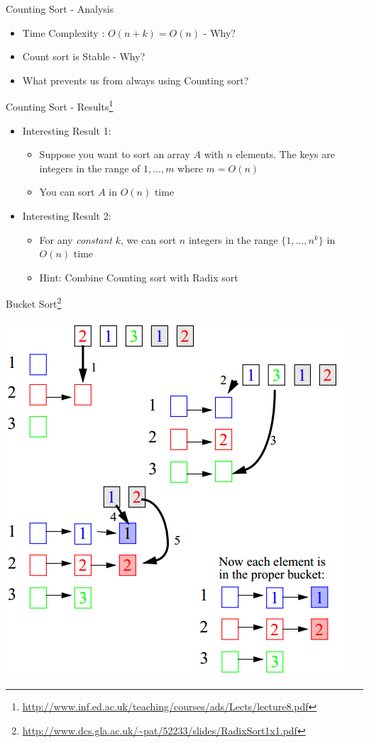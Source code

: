 \documentclass{beamer}
\begin{document}
\begin{frame}{Counting Sort - Analysis}
\begin{itemize}
\item Time Complexity : $O(n+k) = O(n)$ - Why?
\item Count sort is Stable - Why?
\item What prevents us from always using Counting sort?
\end{itemize}
\end{frame}


\begin{frame}{Counting Sort - Results\footnote{\url{http://www.inf.ed.ac.uk/teaching/courses/ads/Lects/lecture8.pdf}}}
\begin{itemize}
\item Interesting Result 1:
\begin{itemize}
    \item Suppose you want to sort an array $A$ with $n$ elements. The keys are integers in the range of $1, \ldots, m$ where $m=O(n)$
    \item You can sort $A$ in $O(n)$ time
\end{itemize}
\item Interesting Result 2:
\begin{itemize}
    \item For any {\em constant} $k$, we can sort $n$ integers in the range $\{1, \ldots, n^k\}$ in $O(n)$ time
    \item Hint: Combine Counting sort with Radix sort
\end{itemize}
\end{itemize}
\end{frame}


\begin{frame}{Bucket Sort\footnote{\url{http://www.dcs.gla.ac.uk/~pat/52233/slides/RadixSort1x1.pdf}}}
\begin{center}
    \includegraphics[scale=0.4]{bucketSortEg1.png}
\end{center}
\end{frame}
\end{document}
